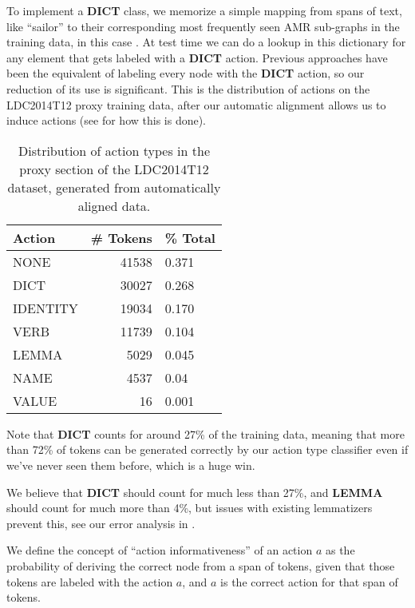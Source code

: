 \documentclass[11pt]{article}
\begin{document}
To implement a \textbf{DICT} class, we memorize a simple mapping from spans of text, like ``sailor'' to their corresponding most frequently seen AMR sub-graphs in the training data, in this case . At test time we can do a lookup in this dictionary for any element that gets labeled with a \textbf{DICT} action. Previous approaches have been the equivalent of labeling every node with the \textbf{DICT} action, so our reduction of its use is significant. This is the distribution of actions on the LDC2014T12 proxy training data, after our automatic alignment allows us to induce actions (see  for how this is done).

\begin{table}[h]
\begin{center}
\begin{tabular}{|l|rl|}
\hline \bf Action & \bf \# Tokens & \bf \% Total \\ \hline
NONE & 41538 & 0.371\\
DICT & 30027 & 0.268 \\
IDENTITY & 19034 & 0.170 \\
VERB & 11739 & 0.104 \\
LEMMA & 5029 & 0.045 \\
NAME & 4537 & 0.04 \\
VALUE & 16  & 0.001\\
\hline
\end{tabular}
\end{center}
\caption{\label{font-table} Distribution of action types in the proxy section of the LDC2014T12 dataset, generated from automatically aligned data. }
\end{table}

Note that \textbf{DICT} counts for around 27\% of the training data, meaning that more than 72\% of tokens can be generated correctly by our action type classifier even if we've never seen them before, which is a huge win.

We believe that \textbf{DICT} should count for much less than 27\%, and \textbf{LEMMA} should count for much more than 4\%, but issues with existing lemmatizers prevent this, see our error analysis in .


We define the concept of ``action informativeness'' of an action $a$ as the probability of deriving the correct node from a span of tokens, given that those tokens are labeled with the action $a$, and $a$ is the correct action for that span of tokens.
\end{document}
